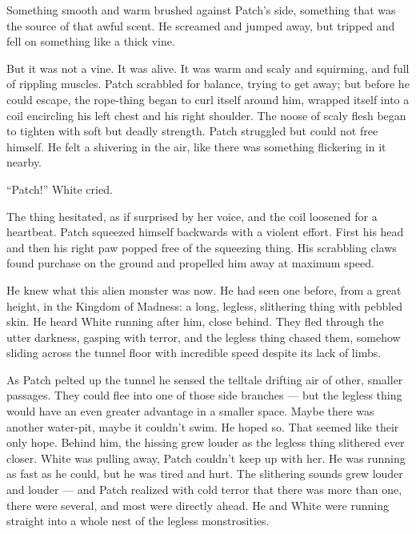 \documentclass[ebook,oneside,openany,17pt]{memoir}
\newenvironment{tolerant}[1]{%
  \par\tolerance=#1\relax
}{%
  \par
}
\begin{document}
\begin{tolerant}{500}
Something smooth and warm brushed against Patch’s side, something that
was the source of that awful scent. He screamed and jumped away, but
trip\-ped and fell on something like a thick vine.
\end{tolerant}

But it was not a vine. It was alive. It was warm and scaly and
squirming, and full of rippling muscles. Patch scrabbled for balance,
trying to get away; but before he could escape, the rope-thing began
to curl itself around him, wrapped itself into a coil encircling his
left chest and his right shoulder. The noose of scaly flesh began to
tighten with soft but deadly strength. Patch struggled but could not
free himself. He felt a shivering in the air, like there was something
flickering in it nearby.

“Patch!” White cried.

\begin{tolerant}{2000}
The thing hesitated, as if surprised by her voice, and the coil
loosened for a heartbeat. Patch squeezed himself backwards with a
violent effort. First his head and then his right paw popped free of
the squeezing thing. His scrabbling claws found purchase on the ground
and propelled him away at maximum speed.
\end{tolerant}

\begin{tolerant}{2000}
He knew what this alien monster was now. He had seen one before, from
a great height, in the Kingdom of Madness: a long, legless, slithering
thing with pebbled skin. He heard White running after him, close
behind. They fled through the utter darkness, gasping with terror, and
the legless thing chased them, somehow sliding across the tunnel floor
with incredible speed despite its lack of limbs.
\end{tolerant}

\begin{tolerant}{1000}
As Patch pelted up the tunnel he sensed the telltale drifting air of
other, smaller passages. They could flee into one of those side
branches — but the legless thing would have an even greater advantage
in a smaller space. Maybe there was another water-pit, maybe it
couldn’t swim. He hoped so. That seemed like their only hope. Behind
him, the hissing grew louder as the legless thing slithered ever
closer. White was pulling away, Patch couldn’t keep up with her. He
was running as fast as he could, but he was tired and hurt. The
slithering sounds grew louder and louder — and Patch realized with
cold terror that there was more than one, there were several, and most
were directly ahead. He and White were running straight into a whole
nest of the legless monstrosities.
\end{tolerant}
\end{document}

